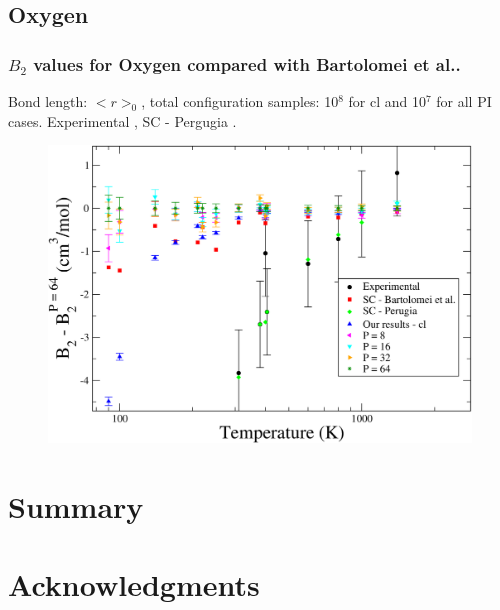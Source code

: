 \documentclass[xcolor=svgnames]{beamer}
\begin{document}
        \subsection{Oxygen}
            \begin{frame}
                \frametitle{$B_2$ values for Oxygen compared with Bartolomei et al..}
                \begin{center}Bond length: $< r >_0$, total configuration samples: 10$^8$ for cl and 10$^7$ for all PI cases. Experimental , SC - Pergugia .\end{center}
                \begin{figure}[!htbp]
                    \centering
                    \includegraphics[scale=0.12,keepaspectratio]{B2O2AllDiffMRCI.png}
                \end{figure}
            \end{frame}

	\section{Summary}
	\section*{Acknowledgments}
\end{document}

